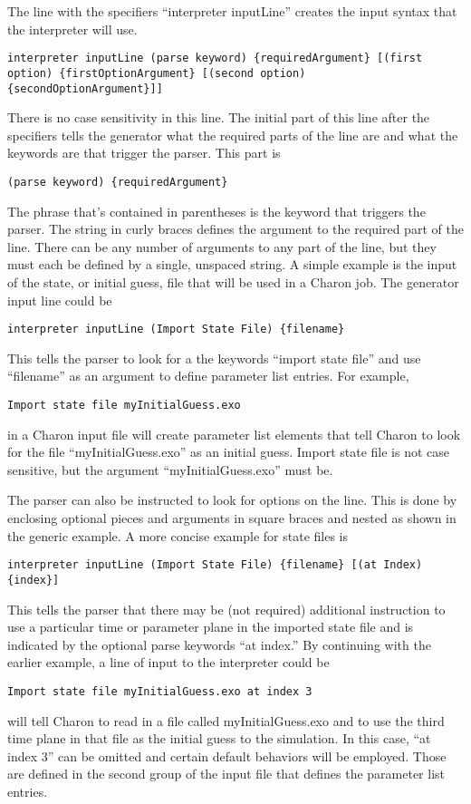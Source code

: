 The line with the specifiers ``interpreter inputLine'' creates the
input syntax that the interpreter will use.
\begin{lstlisting}
interpreter inputLine (parse keyword) {requiredArgument} [(first option) {firstOptionArgument} [(second option) {secondOptionArgument}]]
\end{lstlisting}
There is no case sensitivity in this line.  The initial part of this
line after the specifiers tells the generator what the required parts
of the line are and what the keywords are that trigger the parser.
This part is
\begin{lstlisting}
(parse keyword) {requiredArgument}
\end{lstlisting}
The phrase that's contained in parentheses is the keyword that
triggers the parser.  The string in curly braces defines the argument
to the required part of the line.  There can be any number of
arguments to any part of the line, but they must each be defined by a
single, unspaced string.  A simple example is the input of the state,
or initial guess, file that will be used in a Charon job.  The
generator input line could be
\begin{lstlisting}
interpreter inputLine (Import State File) {filename}
\end{lstlisting}
This tells the parser to look for a the keywords ``import state file''
and use ``filename'' as an argument to define parameter list
entries.  For example,
\begin{lstlisting}
Import state file myInitialGuess.exo
\end{lstlisting}
in a Charon input file will create parameter list elements that tell
Charon to look for the file ``myInitialGuess.exo'' as an initial
guess.  Import state file is not case sensitive, but the argument
``myInitialGuess.exo'' must be.

The parser can also be instructed to look for options on the line.
This is done by enclosing optional pieces and arguments in square
braces and nested as shown in the generic example.  A more concise
example for state files is
\begin{lstlisting}
interpreter inputLine (Import State File) {filename} [(at Index) {index}]
\end{lstlisting}
This tells the parser that there may be (not required) additional
instruction to use a particular time or parameter plane in the
imported state file and is indicated by the optional parse keywords
``at index.''  By continuing with the earlier example, a line of input
to the interpreter could be
\begin{lstlisting}
Import state file myInitialGuess.exo at index 3
\end{lstlisting}
will tell Charon to read in a file called myInitialGuess.exo and to
use the third time plane in that file as the initial guess to the
simulation.  In this case, ``at index 3'' can be omitted and certain
default behaviors will be employed.  Those are defined in the second
group of the input file that defines the parameter list entries.

